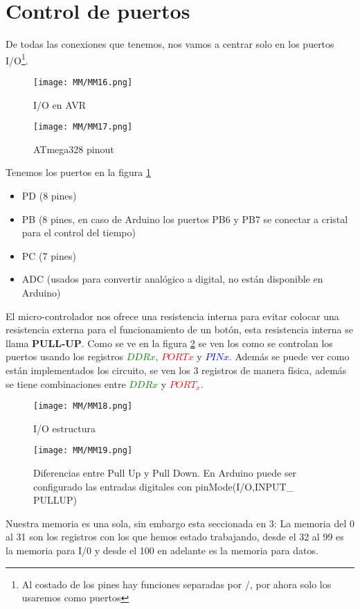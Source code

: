\documentclass[
	12pt, %
	fleqn, %
	a4paper, %
	oneside, %
]{LegrandOrangeBook}
\begin{document}
\section{Control de puertos}\label{Control de puertos}
De todas las conexiones que tenemos, nos vamos a centrar solo en los puertos I/O\footnote{Al costado de los pines hay funciones separadas por /, por ahora solo los usaremos como puertos}.
\begin{figure}[H]
\centering
\texttt{[image: MM/MM16.png]}
\caption{I/O en AVR}
\end{figure}
\begin{figure}[]
\centering
\texttt{[image: MM/MM17.png]}
\caption{ATmega328 pinout}
\label{fig:ATmega328 pinout}
\end{figure}
Tenemos los puertos en la figura \ref{fig:ATmega328 pinout}
\begin{itemize}
\item PD (8 pines)
\item PB (8 pines, en caso de Arduino los puertos PB6 y PB7 se conectar a cristal para el control del tiempo)
\item PC (7 pines)
\item ADC (usados para convertir analógico a digital, no están disponible en Arduino)
\end{itemize}
El micro-controlador nos ofrece una resistencia interna para evitar colocar una resistencia externa para el funcionamiento de un botón, esta resistencia interna se llama \textbf{PULL-UP}. Como se ve en la figura \ref{fig:I/O estructura} se ven los como se controlan los puertos usando los registros \textcolor{green}{$DDRx$}, \textcolor{red}{$PORTx$} y \textcolor{blue}{$PINx$}. Además se puede ver como están implementados los circuito, se ven los 3 registros de manera física, además se tiene combinaciones entre \textcolor{green}{$DDRx$} y \textcolor{red}{$PORT_x$}.
\begin{figure}[H]
\centering
\texttt{[image: MM/MM18.png]}
\caption{I/O estructura}
\label{fig:I/O estructura}
\end{figure}
\begin{figure}[H]
\centering
\texttt{[image: MM/MM19.png]}
\caption{Diferencias entre Pull Up y Pull Down. En Arduino puede ser configurado las entradas digitales con pinMode(I/O,INPUT\_ PULLUP)}
\label{fig:pull down and up}
\end{figure}
\begin{remark}
Nuestra memoria es una sola, sin embargo esta seccionada en 3: La memoria del 0 al 31 son los registros con los que hemos estado trabajando, desde el 32 al 99 es la memoria para I/0 y desde el 100 en adelante es la memoria para datos.
\end{remark}
\end{document}
